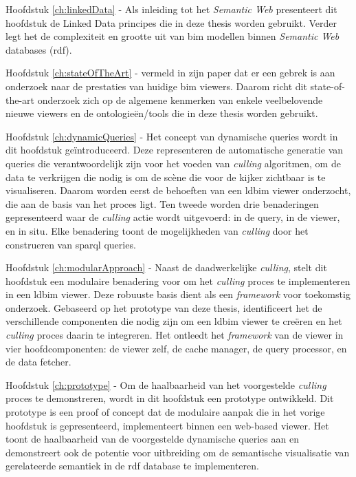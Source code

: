 \begin{refsection}
\begin{multicols}{2}
        \textsf{Hoofdstuk \ref{ch:linkedData} -}
        Als inleiding tot het \emph{Semantic Web} presenteert dit hoofdstuk de Linked Data principes die in deze thesis worden gebruikt. Verder legt het de complexiteit en grootte uit van \ac{bim} modellen binnen \emph{Semantic Web} databases (\ac{rdf}).

        \textsf{Hoofdstuk \ref{ch:stateOfTheArt} -}
        \cite{Johansson2015} vermeld in zijn paper dat er een gebrek is aan onderzoek naar de prestaties van huidige \ac{bim} viewers. Daarom richt dit state-of-the-art onderzoek zich op de algemene kenmerken van enkele veelbelovende nieuwe viewers en de ontologieën/tools die in deze thesis worden gebruikt.

        \textsf{Hoofdstuk \ref{ch:dynamicQueries} -}
        Het concept van dynamische queries wordt in dit hoofdstuk geïntroduceerd. Deze representeren de automatische generatie van queries die verantwoordelijk zijn voor het voeden van \emph{culling} algoritmen, om de data te verkrijgen die nodig is om de scène die voor de kijker zichtbaar is te visualiseren. Daarom worden eerst de behoeften van een \ac{ldbim} viewer onderzocht, die aan de basis van het proces ligt. Ten tweede worden drie benaderingen gepresenteerd waar de \emph{culling} actie wordt uitgevoerd: in de query, in de viewer, en in situ. Elke benadering toont de mogelijkheden van \emph{culling} door het construeren van \ac{sparql} queries.

        \textsf{Hoofdstuk \ref{ch:modularApproach} -}
        Naast de daadwerkelijke \emph{culling}, stelt dit hoofdstuk een modulaire benadering voor om het \emph{culling} proces te implementeren in een \ac{ldbim} viewer. Deze robuuste basis dient als een \emph{framework} voor toekomstig onderzoek. Gebaseerd op het prototype van deze thesis, identificeert het de verschillende componenten die nodig zijn om een \ac{ldbim} viewer te creëren en het \emph{culling} proces daarin te integreren. Het ontleedt het \emph{framework} van de viewer in vier hoofdcomponenten: de viewer zelf, de cache manager, de query processor, en de data fetcher.

        \textsf{Hoofdstuk \ref{ch:prototype} -}
        Om de haalbaarheid van het voorgestelde \emph{culling} proces te demonstreren, wordt in dit hoofdstuk een prototype ontwikkeld. Dit prototype is een proof of concept dat de modulaire aanpak die in het vorige hoofdstuk is gepresenteerd, implementeert binnen een web-based viewer. Het toont de haalbaarheid van de voorgestelde dynamische queries aan en demonstreert ook de potentie voor uitbreiding om de semantische visualisatie van gerelateerde semantiek in de \ac{rdf} database te implementeren.


\end{multicols}
\end{refsection}
